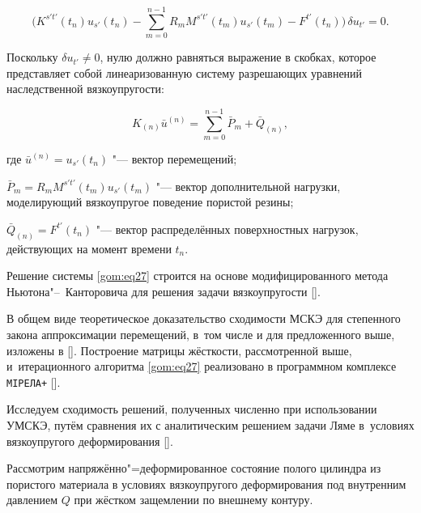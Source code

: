 $$\biggl(K^{s't'}(t_{n})u_{s'}(t_{n})-\sum_{m=0}^{n-1}R_{m}M^{s't'}(t_{m})u_{s'}(t_{m})-F^{t'}(t_{n})\biggr)\,\delta u_{t'}=0.$$



Поскольку $\delta u_{t'}\neq 0$, нулю должно равняться выражение в скобках, которое представляет собой линеаризованную систему разрешающих уравнений наследственной вязкоупругости:

\begin{equation}

K_{(n)}\bar{u}^{(n)}=\sum_{m=0}^{n-1}\bar{P}_{m}+\bar{Q}_{(n)},

\label{gom:eq27}

\end{equation}

где $\bar{u}^{(n)}=u_{s'}(t_{n})$ "--- вектор перемещений; 

$\bar{P}_{m}={R_{m}}M^{s't'}(t_{m})u_{s'}(t_{m})$ "--- вектор дополнительной нагрузки, моделирующий вязкоупругое поведение пористой резины; 

$\bar{Q}_{(n)}=F^{t'}(t_{n})$ "--- вектор распределённых поверхностных нагрузок, действующих на момент времени $t_{n}$.



Решение системы \eqref{gom:eq27} строится на основе модифицированного метода Ньютона"--~Канторовича для решения задачи вязкоупругости [].



В общем виде теоретическое доказательство сходимости МСКЭ для степенного закона аппроксимации перемещений, в~том числе и для предложенного выше, изложены в []. Построение матрицы жёсткости, рассмотренной выше, и~итерационного алгоритма \eqref{gom:eq27} реализовано в программном комплексе {\tt МІРЕЛА+} [].



\smallskip




Исследуем сходимость решений, полученных численно при использовании УМСКЭ, путём сравнения их с аналитическим решением задачи Ляме в~условиях вязкоупругого деформирования [].



Рассмотрим напряжённо"=деформированное состояние полого цилиндра из пористого материала в условиях вязкоупругого деформирования под внутренним давлением $Q$ при жёстком защемлении по внешнему контуру. 

